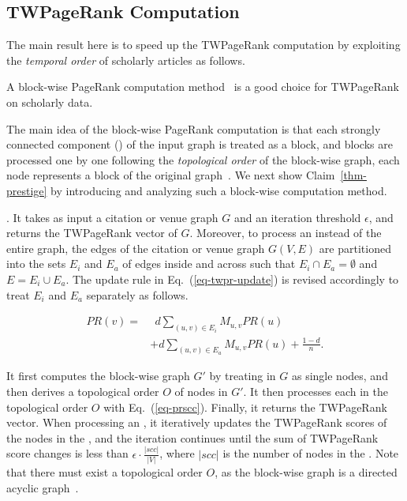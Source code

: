 \subsection{TWPageRank Computation}
\label{subsec-TWPageRank-computation}

The main result here is to speed up the TWPageRank computation by exploiting the {\em temporal order} of scholarly articles as follows.


\begin{claim}
\label{thm-prestige}
A block-wise PageRank computation method~\cite{Berkhin05} is a good choice for TWPageRank on scholarly data.
\end{claim}

The main idea of the block-wise PageRank computation is that each strongly connected component (\scc) of the input graph is treated as a block, and blocks are processed one by one following the {\em topological order} of the block-wise graph, \ie each node represents a block of the original graph~\cite{Berkhin05}.
We next show Claim~\ref{thm-prestige} by introducing and analyzing such a block-wise computation method.




.  It takes as input a citation or venue graph $G$ and an iteration threshold $\epsilon$, and returns the TWPageRank vector of $G$.
Moreover, to process an \scc instead of the entire graph, the edges of the citation or venue graph $G(V, E)$ are partitioned into the sets $E_i$ and $E_a$ of edges inside and across \sccs  such that $E_i\cap E_a = \emptyset$ and $E = E_i \cup E_a$.  The update rule in Eq.~(\ref{eq-twpr-update})  is revised accordingly to treat $E_i$ and $E_a$ separately as follows.

\vspace{-2ex}
\begin{small}
\begin{equation}\label{eq-prscc}
\begin{split}
PR(v) =  & \ \ d \sum_{(u,v)\in E_i} M_{u,v} PR(u) \\
 & + d \sum_{(u,v)\in E_a} M_{u,v} PR(u) +  \frac{1-d}{n}.
\end{split}
\end{equation}
\end{small}
%
It first computes the block-wise graph $G'$ by treating \sccs in $G$ as single nodes, and then derives a topological order $O$ of nodes in $G'$. It then processes each \scc in the topological order  $O$ with Eq.~(\ref{eq-prscc}). Finally, it returns the TWPageRank vector. When processing an \scc, it iteratively updates the TWPageRank scores of the nodes in the \scc, and the iteration continues until the sum of TWPageRank score changes is less than $\epsilon\cdot\frac{|scc|}{|V|}$, where $|scc|$ is the number of nodes in the \scc. Note that there must exist a topological order $O$, as the block-wise graph is a directed acyclic graph~\cite{CormenLRS01}.


